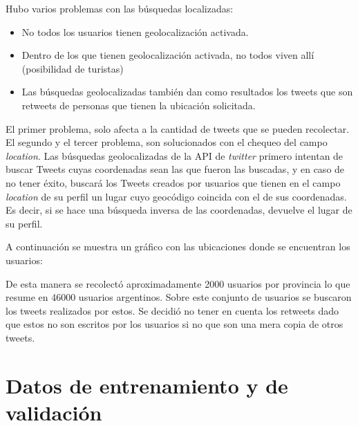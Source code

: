 Hubo varios problemas con las búsquedas localizadas:
\begin{itemize}
    \item No todos los usuarios tienen geolocalización activada.
    \item Dentro de los que tienen geolocalización activada, no todos viven allí (posibilidad de turistas)
    \item Las búsquedas geolocalizadas también dan como resultados los tweets que son retweets de personas que tienen la ubicación solicitada.
\end{itemize}
El primer problema, solo afecta a la cantidad de tweets que se pueden recolectar.
El segundo y el tercer problema, son solucionados con el chequeo del campo \textit{location}.
Las búsquedas geolocalizadas de la API de \textit{twitter} primero intentan de buscar Tweets cuyas coordenadas sean las que fueron las buscadas, y en caso de no tener éxito, buscará los Tweets creados por usuarios que tienen en el campo \textit{location} de su perfil un lugar cuyo geocódigo coincida con el de sus coordenadas. Es decir, si se hace una búsqueda inversa de las coordenadas, devuelve el lugar de su perfil.  

A continuación se muestra un gráfico con las ubicaciones donde se encuentran los usuarios:



De esta manera se recolectó aproximadamente 2000 usuarios por provincia lo que resume en 46000 usuarios argentinos. Sobre este conjunto de usuarios se buscaron los tweets realizados por estos. Se decidió no tener en cuenta los retweets dado que estos no son escritos por los usuarios si no que son una mera copia de otros tweets. %

\section{Datos de entrenamiento y de validación}


